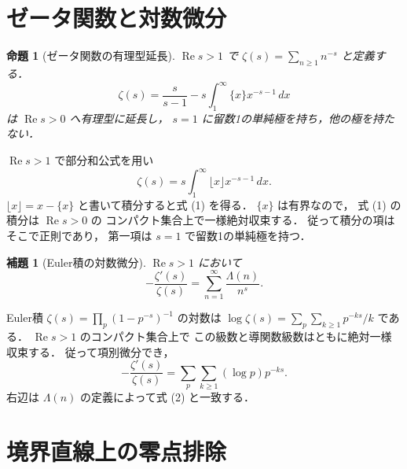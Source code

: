 \documentclass[a5paper,10pt,onecolumn]{jsarticle}
\makeatletter
\theoremstyle{mathnotetheorem}
\newtheorem{lemma}[theorem]{補題}
\newtheorem{proposition}[theorem]{命題}
\renewcommand{\proofname}{証明}
\renewenvironment{proof}[1][\proofname]{%
  \par\pushQED{\qed}\normalfont\topsep4\p@\@plus2\p@\relax
  \trivlist\item[\hskip\labelsep\bfseries #1]\ignorespaces
}{\popQED\endtrivlist\@endpefalse}
\makeatother
\begin{document}
\section{ゼータ関数と対数微分}

\begin{proposition}[ゼータ関数の有理型延長]
\label{prop:zeta-cont}
$\operatorname{Re}s>1$ で
$\zeta(s)=\sum_{n\ge1}n^{-s}$ と定義する．
\[
 \zeta(s)=\frac{s}{s-1}
 -s\int_1^\infty\{x\}x^{-s-1}\,dx
 \tag{1}
\]
は $\operatorname{Re}s>0$ へ有理型に延長し，
$s=1$ に留数1の単純極を持ち，他の極を持たない．
\end{proposition}
\begin{proof}
$\operatorname{Re}s>1$ で部分和公式を用い
\[
 \zeta(s)=s\int_1^\infty\lfloor x\rfloor x^{-s-1}\,dx.
\]
$\lfloor x\rfloor=x-\{x\}$ と書いて積分すると式 (1) を得る．
$\{x\}$ は有界なので，
式 (1) の積分は $\operatorname{Re}s>0$ の
コンパクト集合上で一様絶対収束する．
従って積分の項はそこで正則であり，
第一項は $s=1$ で留数1の単純極を持つ．
\end{proof}

\begin{lemma}[Euler積の対数微分]\label{lem:logder}
$\operatorname{Re}s>1$ において
\[
 -\frac{\zeta'(s)}{\zeta(s)}
 =\sum_{n=1}^\infty\frac{\Lambda(n)}{n^s}.
 \tag{2}
\]
\end{lemma}
\begin{proof}
Euler積
$\zeta(s)=\prod_p(1-p^{-s})^{-1}$ の対数は
$\log\zeta(s)=\sum_p\sum_{k\ge1}p^{-ks}/k$
である．
$\operatorname{Re}s>1$ のコンパクト集合上で
この級数と導関数級数はともに絶対一様収束する．
従って項別微分でき，
\[
 -\frac{\zeta'(s)}{\zeta(s)}
 =\sum_p\sum_{k\ge1}(\log p)p^{-ks}.
\]
右辺は $\Lambda(n)$ の定義によって式 (2) と一致する．
\end{proof}

\section{境界直線上の零点排除}
\end{document}
